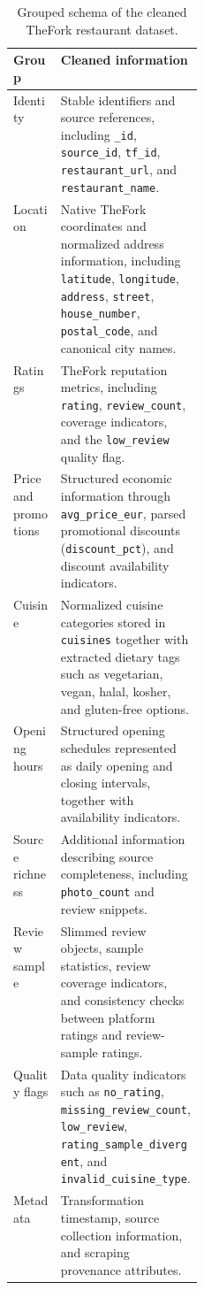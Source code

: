 \begin{table}[t]
\centering
\footnotesize
\setlength{\tabcolsep}{5pt}
\renewcommand{\arraystretch}{1.2}
\begin{tabularx}{\linewidth}{@{}p{0.25\linewidth}Y@{}}
\toprule
\textbf{Group} & \textbf{Cleaned information} \\
\midrule
Identity & Stable identifiers and source references, including \texttt{\_id}, \texttt{source\_id}, \texttt{tf\_id}, \texttt{restaurant\_url}, and \texttt{restaurant\_name}. \\
Location & Native TheFork coordinates and normalized address information, including \texttt{latitude}, \texttt{longitude}, \texttt{address}, \texttt{street}, \texttt{house\_number}, \texttt{postal\_code}, and canonical city names. \\
Ratings & TheFork reputation metrics, including \texttt{rating}, \texttt{review\_count}, coverage indicators, and the \texttt{low\_review} quality flag. \\
Price and promotions & Structured economic information through \texttt{avg\_price\_eur}, parsed promotional discounts (\texttt{discount\_pct}), and discount availability indicators. \\
Cuisine & Normalized cuisine categories stored in \texttt{cuisines} together with extracted dietary tags such as vegetarian, vegan, halal, kosher, and gluten-free options. \\
Opening hours & Structured opening schedules represented as daily opening and closing intervals, together with availability indicators. \\
Source richness & Additional information describing source completeness, including \texttt{photo\_count} and review snippets. \\
Review sample & Slimmed review objects, sample statistics, review coverage indicators, and consistency checks between platform ratings and review-sample ratings. \\
Quality flags & Data quality indicators such as \texttt{no\_rating}, \texttt{missing\_review\_count}, \texttt{low\_review}, \texttt{rating\_sample\_divergent}, and \texttt{invalid\_cuisine\_type}. \\
Metadata & Transformation timestamp, source collection information, and scraping provenance attributes. \\
\bottomrule
\end{tabularx}
\caption{Grouped schema of the cleaned TheFork restaurant dataset.}
\label{tab:clean-thefork-schema}
\end{table}


